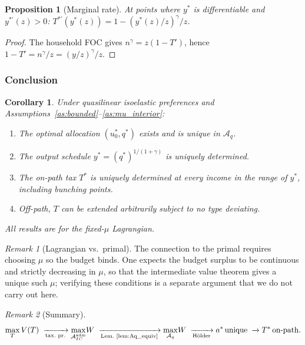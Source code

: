 \documentclass[12pt,a4paper]{article}
\theoremstyle{definition}
\theoremstyle{plain}
\newtheorem{proposition}{Proposition}[section]
\newtheorem{corollary}{Corollary}[section]
\theoremstyle{remark}
\newtheorem{remark}{Remark}[section]
\newcommand{\calA}{\mathcal{A}}
\begin{document}
\begin{proposition}[Marginal rate]
\label{prop:marginal}
At points where $y^*$ is differentiable and
$y^{*\prime}(z) > 0$:
$T^{*\prime}(y^*(z)) = 1 - (y^*(z)/z)^\gamma/z$.
\end{proposition}

\begin{proof}
The household FOC gives $n^\gamma = z(1-T')$, hence
$1-T' = n^\gamma/z = (y/z)^\gamma/z$.
\end{proof}


\subsubsection{Conclusion}

\begin{corollary}
\label{cor:T_unique}
Under quasilinear isoelastic preferences
and Assumptions~\ref{as:bounded}--\ref{as:mu_interior}:
\begin{enumerate}[label=(\roman*)]
\item The optimal allocation $(u_0^*, q^*)$ exists
  and is unique in $\calA_q$.
\item The output schedule
  $y^* = (q^*)^{1/(1+\gamma)}$ is uniquely
  determined.
\item The on-path tax $T^*$ is uniquely determined
  at every income in the range of $y^*$, including
  bunching points.
\item Off-path, $T$ can be extended arbitrarily
  subject to no type deviating.
\end{enumerate}
All results are for the fixed-$\mu$ Lagrangian.
\end{corollary}

\begin{remark}[Lagrangian vs.\ primal]
\label{rem:lagrangian_primal}
The connection to the primal requires choosing $\mu$ so
the budget binds.  One expects the budget surplus to be
continuous and strictly decreasing in $\mu$, so that the
intermediate value theorem gives a unique such $\mu$;
verifying these conditions is a separate argument that
we do not carry out here.
\end{remark}

\begin{remark}[Summary]
\label{rem:summary}
\[
  \max_T V(T)
  \;\xrightarrow[\text{tax.\ pr.}]{}
  \max_{\calA_{IC}^{\mathrm{adm}}}\! W
  \;\xrightarrow[\text{Lem.~\ref{lem:Aq_equiv}}]{}
  \max_{\calA_q}\! W
  \;\xrightarrow[\text{H\"older}]{}
  a^*\!\text{ unique}
  \;\xrightarrow[]{}
  T^*\!\text{ on-path}.
\]
\end{remark}
\end{document}
